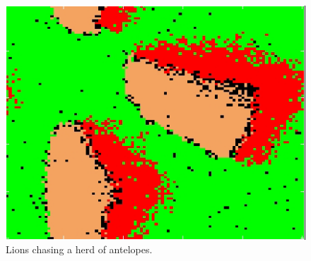 \documentclass[11pt]{article}
\begin{document}
\begin{figure}
\centering
\includegraphics[scale=1]{chasedHerd}
\caption{Lions chasing a herd of antelopes.}
\label{fig:chasedAntelopesHerd}
\end{figure}
\end{document}
